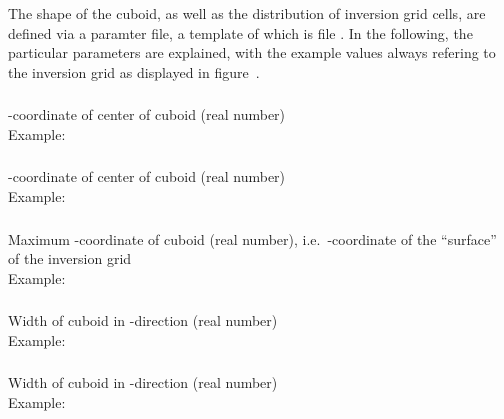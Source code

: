 The shape of the cuboid, as well as the distribution of inversion grid cells, are defined 
via a paramter file, a template of which is file .
In the following, the particular parameters are explained, with the example
values always refering to the inversion grid as displayed in figure~.

\subsubsection{}
-coordinate of center of cuboid (real number)\\
Example:\\
\subsubsection{}
-coordinate of center of cuboid (real number)\\
Example:\\
\subsubsection{}
Maximum -coordinate of cuboid (real number), i.e.\ -coordinate of the 
``surface'' of the inversion grid\\
Example:\\
\subsubsection{}
Width of cuboid in -direction (real number)\\
Example:\\
\subsubsection{}
Width of cuboid in -direction (real number)\\
Example:\\
